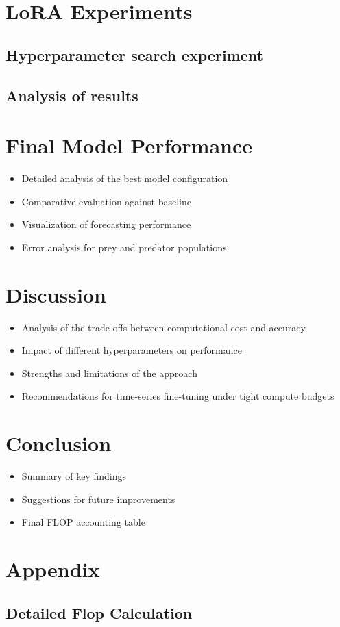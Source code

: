 \documentclass{article}
\begin{document}
\section*{LoRA Experiments}
\subsection*{Hyperparameter search experiment}
\subsection*{Analysis of results}

\section*{ Final Model Performance}

\begin{itemize}
    \item Detailed analysis of the best model configuration
   \item  Comparative evaluation against baseline
   \item  Visualization of forecasting performance
   \item Error analysis for prey and predator populations
\end{itemize}

\section*{ Discussion}
\begin{itemize}
    \item Analysis of the trade-offs between computational cost and accuracy
\item Impact of different hyperparameters on performance
\item Strengths and limitations of the approach
\item Recommendations for time-series fine-tuning under tight compute budgets
\end{itemize}


\section*{Conclusion}

\begin{itemize}
    \item  Summary of key findings
     \item Suggestions for future improvements
     \item Final FLOP accounting table
\end{itemize}

\section*{Appendix}
\subsection*{Detailed Flop Calculation} 



\end{document}
